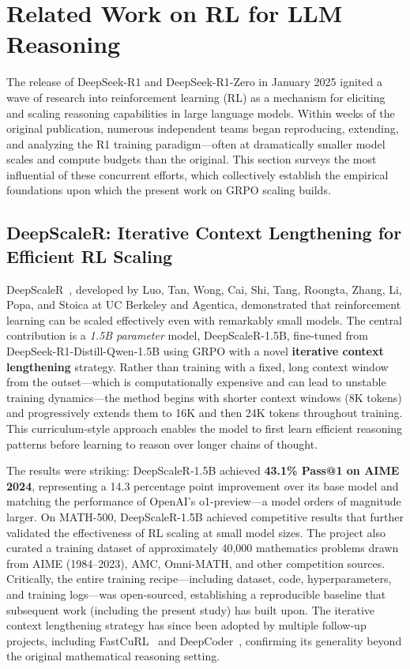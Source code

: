 \section{Related Work on RL for LLM Reasoning}
\label{sec:related-work-rl-reasoning}

The release of DeepSeek-R1 and DeepSeek-R1-Zero in January 2025 ignited a wave of research into reinforcement learning (RL) as a mechanism for eliciting and scaling reasoning capabilities in large language models. Within weeks of the original publication, numerous independent teams began reproducing, extending, and analyzing the R1 training paradigm---often at dramatically smaller model scales and compute budgets than the original. This section surveys the most influential of these concurrent efforts, which collectively establish the empirical foundations upon which the present work on GRPO scaling builds.

\subsection*{DeepScaleR: Iterative Context Lengthening for Efficient RL Scaling}

DeepScaleR~\cite{luo2025deepscaler}, developed by Luo, Tan, Wong, Cai, Shi, Tang, Roongta, Zhang, Li, Popa, and Stoica at UC Berkeley and Agentica, demonstrated that reinforcement learning can be scaled effectively even with remarkably small models. The central contribution is a \emph{1.5B parameter} model, DeepScaleR-1.5B, fine-tuned from DeepSeek-R1-Distill-Qwen-1.5B using GRPO with a novel \textbf{iterative context lengthening} strategy. Rather than training with a fixed, long context window from the outset---which is computationally expensive and can lead to unstable training dynamics---the method begins with shorter context windows (8K tokens) and progressively extends them to 16K and then 24K tokens throughout training. This curriculum-style approach enables the model to first learn efficient reasoning patterns before learning to reason over longer chains of thought.

The results were striking: DeepScaleR-1.5B achieved \textbf{43.1\% Pass@1 on AIME 2024}, representing a 14.3 percentage point improvement over its base model and matching the performance of OpenAI's o1-preview---a model orders of magnitude larger. On MATH-500, DeepScaleR-1.5B achieved competitive results that further validated the effectiveness of RL scaling at small model sizes. The project also curated a training dataset of approximately 40,000 mathematics problems drawn from AIME (1984--2023), AMC, Omni-MATH, and other competition sources. Critically, the entire training recipe---including dataset, code, hyperparameters, and training logs---was open-sourced, establishing a reproducible baseline that subsequent work (including the present study) has built upon. The iterative context lengthening strategy has since been adopted by multiple follow-up projects, including FastCuRL~\cite{song2025fastcurl} and DeepCoder~\cite{xu2025deepcoder}, confirming its generality beyond the original mathematical reasoning setting.

